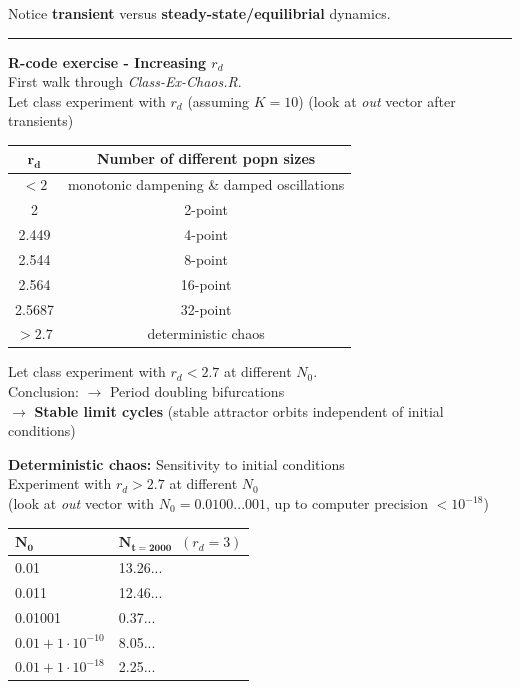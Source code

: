 \documentclass{article}
\newcommand{\note}[1]{\colorbox{gray!30}{#1}}
\newcommand{\ind}{\-\hspace{1cm}}
\begin{document}
Notice \textbf{transient} versus \textbf{steady-state/equilibrial} dynamics.

\rule[0.5ex]{\linewidth}{1pt}


\textbf{R-code exercise - Increasing $r_d$}\\
\note{First walk through \emph{Class-Ex-Chaos.R}.}  \\
\note{Let class experiment with $r_d$ (assuming $K=10$)} (look at \emph{out} vector after transients)

\begin{table}[h]
\centering
\begin{tabular}{cc}
$\mathbf{r_d}$ & \textbf{Number of different popn sizes} \\ 
\hline
 $<2$ & monotonic dampening \& damped oscillations \\ 
2 &  2-point \\ 
2.449 & 4-point \\ 
2.544 & 8-point \\ 
2.564 &  16-point\\ 
2.5687 & 32-point \\ 
$> 2.7$ & deterministic chaos\\
 \hline
\end{tabular} 
\end{table}
\note{Let class experiment with $r_d<2.7$ at different $N_0$.}\\
Conclusion:
$\to$ Period doubling bifurcations\\
\ind \ind $\to$ \textbf{Stable limit cycles} (stable attractor orbits independent of initial conditions)

\textbf{Deterministic chaos:} Sensitivity to initial conditions\\
\note{Experiment with $r_d > 2.7$ at different $N_0$} \\
\ind (look at \emph{out} vector with $N_0=0.0100...001$, up to computer precision $<10^{-18}$)

\begin{table}[h]
\centering
\begin{tabular}{ll}
$\mathbf{N_0}$ & $\mathbf{N_{t=2000}}\;\; (r_d=3)$ \\ 
\hline
0.01 & 13.26...\\
0.011 & 12.46... \\
0.01001 & 0.37... \\
$0.01 + 1 \cdot 10^{-10} $ & 8.05...\\
$ 0.01 + 1 \cdot 10^{-18} $ & 2.25...\\
\hline
\end{tabular} 
\end{table}
\end{document}
